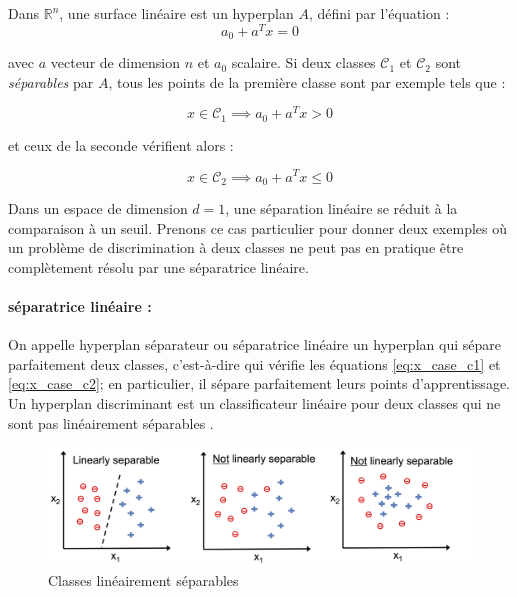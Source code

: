 	Dans $\mathbb{R}^n$, une surface linéaire est un hyperplan $A$, défini par l'équation :
	$$ 
	a_0  + a^Tx = 0
	$$
	
	avec $a$ vecteur de dimension $n$ et $a_0$ scalaire. Si deux classes $\mathcal{C}_1$ et $\mathcal{C}_2$ sont \textit{séparables} par $A$, tous les points de la première classe sont par exemple tels que :
	
	\begin{equation}\label{eq:x_case_c1}
	x \in \mathcal{C}_1 \implies a_0 + a^Tx > 0
	\end{equation}
	
	et ceux de la seconde vérifient alors :
	
	\begin{equation}\label{eq:x_case_c2}
	x \in \mathcal{C}_2 \implies a_0 + a^Tx \leq 0
	\end{equation}
	
	
	Dans un espace de dimension $d = 1$, une séparation linéaire se réduit à la comparaison à un seuil. Prenons ce cas particulier pour donner deux exemples où un problème de discrimination à deux classes ne peut pas en pratique être complètement résolu par une séparatrice linéaire.
	
	\paragraph* {séparatrice linéaire :}On appelle hyperplan séparateur ou séparatrice linéaire un hyperplan qui sépare parfaitement deux classes, c'est-à-dire qui vérifie les équations \ref{eq:x_case_c1} et \ref{eq:x_case_c2}; en particulier, il sépare parfaitement leurs points d'apprentissage. Un hyperplan discriminant est un classificateur linéaire pour deux classes qui ne sont pas linéairement séparables \cite{antoine2018apprentissage}.
	
	\begin{figure}[H]%
		\centering
		\includegraphics[width=\textwidth]{images/linearly_separable.png}
		\caption[Classes linéairement séparables.]{Classes linéairement séparables \cite{ml2008python}}
		\label{fig:linearly_separable}
	\end{figure}
	
